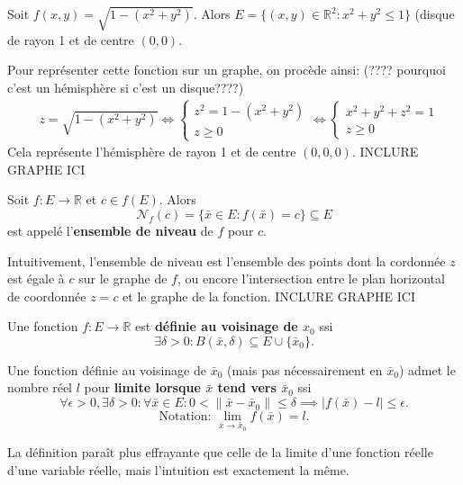 \documentclass{report}
\newcommand*{\norm}[1]{\lVert#1\rVert}
\newcommand*{\abs}[1]{\lvert#1\rvert}
\begin{document}
\begin{exmp}
	Soit $f(x,y) = \sqrt{1 - (x^2 + y^2)}$. Alors $E = \{(x, y) \in \mathbb R^2 : x^2 + y^2 \leq 1\}$ (disque de rayon 1 et de centre $(0, 0)$. \par
	Pour représenter cette fonction sur un graphe, on procède ainsi: (???? pourquoi c'est un hémisphère si c'est un disque????)
	\begin{align*}
		&z = \sqrt{1 - (x^2 + y^2)} \iff 
		\begin{cases}
			z^2 = 1 - (x^2 + y^2) \\
			z \geq 0		
		\end{cases} \iff
		\begin{cases}
			x^2 + y^2 + z^2 = 1 \\
			z \geq 0
		\end{cases}
	\end{align*}
	Cela représente l'hémisphère de rayon 1 et de centre $(0, 0, 0)$. INCLURE GRAPHE ICI
\end{exmp}

\begin{defn}
	Soit $f : E \to \mathbb R$ et $c \in f(E)$. Alors 
	\begin{equation}
	\mathcal N_f(c) = \{\bar x \in E : f(\bar x) = c\} \subseteq E
	\end{equation}
	est appelé l'\textbf{ensemble de niveau} de $f$ pour $c$.
\end{defn}
Intuitivement, l'ensemble de niveau est l'ensemble des points dont la cordonnée $z$ est égale à $c$ sur le graphe de $f$, ou encore l'intersection entre le plan horizontal de coordonnée $z = c$ et le graphe de la fonction. INCLURE GRAPHE ICI

\begin{defn}
	Une fonction $f : E \to \mathbb R$ est \textbf{définie au voisinage de $x_0$} ssi
	\begin{equation}
		\exists \delta > 0 : B(\bar x, \delta) \subseteq E \cup \{\bar x_0\}.
	\end{equation}
\end{defn}

\begin{defn}
	Une fonction définie au voisinage de $\bar x_0$ (mais pas nécessairement en $\bar x_0$) admet le nombre réel $l$ pour \textbf{limite lorsque $\bar x$ tend vers $\bar x_0$} ssi 
	\begin{equation}
	\forall \epsilon > 0, \exists \delta > 0 : \forall \bar x \in E : 0 < \norm{\bar x - \bar x_0} \leq \delta \implies \abs{f(\bar x) - l} \leq \epsilon.
	\end{equation}
	\begin{equation*}
		\text{Notation: } \lim_{\bar x \to \bar x_0} f(\bar x) = l. 
	\end{equation*}
\end{defn} 
\begin{remark}
	La définition paraît plus effrayante que celle de la limite d'une fonction réelle d'une variable réelle, mais l'intuition est exactement la même.
\end{remark}
\end{document}
